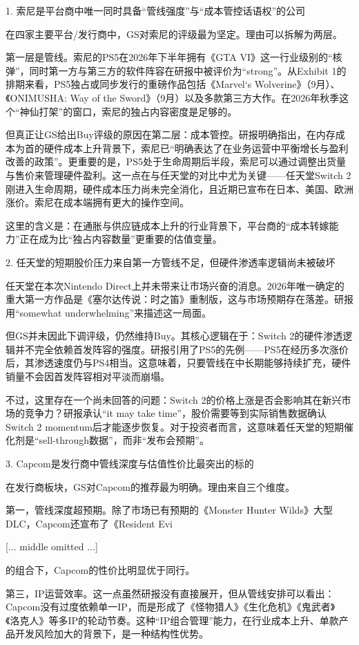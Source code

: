 \documentclass[11pt]{ctexart}
\begin{document}
1. 索尼是平台商中唯一同时具备“管线强度”与“成本管控话语权”的公司

在四家主要平台/发行商中，GS对索尼的评级最为坚定。理由可以拆解为两层。

第一层是管线。索尼的PS5在2026年下半年拥有《GTA VI》这一行业级别的“核弹”，同时第一方与第三方的软件阵容在研报中被评价为“strong”。从Exhibit 1的排期来看，PS5独占或同步发行的重磅作品包括《Marvel‘s Wolverine》（9月）、《ONIMUSHA: Way of the Sword》（9月）以及多款第三方大作。在2026年秋季这个“神仙打架”的窗口，索尼的独占内容密度是足够的。

但真正让GS给出Buy评级的原因在第二层：成本管控。研报明确指出，在内存成本为首的硬件成本上升背景下，索尼已“明确表达了在业务运营中平衡增长与盈利改善的政策”。更重要的是，PS5处于生命周期后半段，索尼可以通过调整出货量与售价来管理硬件盈利。这一点在与任天堂的对比中尤为关键——任天堂Switch 2刚进入生命周期，硬件成本压力尚未完全消化，且近期已宣布在日本、美国、欧洲涨价。索尼在成本端拥有更大的操作空间。

这里的含义是：在通胀与供应链成本上升的行业背景下，平台商的“成本转嫁能力”正在成为比“独占内容数量”更重要的估值变量。

2. 任天堂的短期股价压力来自第一方管线不足，但硬件渗透率逻辑尚未被破坏

任天堂在本次Nintendo Direct上并未带来让市场兴奋的消息。2026年唯一确定的重大第一方作品是《塞尔达传说：时之笛》重制版，这与市场预期存在落差。研报用“somewhat underwhelming”来描述这一局面。

但GS并未因此下调评级，仍然维持Buy。其核心逻辑在于：Switch 2的硬件渗透逻辑并不完全依赖首发阵容的强度。研报引用了PS5的先例——PS5在经历多次涨价后，其渗透速度仍与PS4相当。这意味着，只要管线在中长期能够持续扩充，硬件销量不会因首发阵容相对平淡而崩塌。

不过，这里存在一个尚未回答的问题：Switch 2的价格上涨是否会影响其在新兴市场的竞争力？研报承认“it may take time”，股价需要等到实际销售数据确认Switch 2 momentum后才能逐步恢复。对于投资者而言，这意味着任天堂的短期催化剂是“sell-through数据”，而非“发布会预期”。

3. Capcom是发行商中管线深度与估值性价比最突出的标的

在发行商板块，GS对Capcom的推荐最为明确。理由来自三个维度。

第一，管线深度超预期。除了市场已有预期的《Monster Hunter Wilds》大型DLC，Capcom还宣布了《Resident Evi

[... middle omitted ...]

的组合下，Capcom的性价比明显优于同行。

第三，IP运营效率。这一点虽然研报没有直接展开，但从管线安排可以看出：Capcom没有过度依赖单一IP，而是形成了《怪物猎人》《生化危机》《鬼武者》《洛克人》等多IP的轮动节奏。这种“IP组合管理”能力，在行业成本上升、单款产品开发风险加大的背景下，是一种结构性优势。
\end{document}
